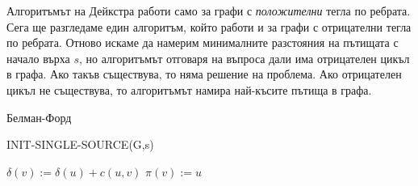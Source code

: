 Алгоритъмът на Дейкстра работи само за графи с {\em положителни} тегла по ребрата.
Сега ще разгледаме един алгоритъм, който работи и за графи с отрицателни тегла по ребрата.
Отново искаме да намерим минималните разстояния на пътищата с начало върха $s$, но
алгоритъмът отговаря на въпроса дали има отрицателен цикъл в графа. Ако такъв съществува, то няма решение на проблема.
Ако отрицателен цикъл не съществува, то алгоритъмът намира най-късите пътища в графа.


\begin{algorithm}
  \caption{Белман-Форд}
  \label{alg:belman-ford}
  
  \begin{algorithmic}[1]
    
    \STATE INIT-SINGLE-SOURCE(G,s)
    
    \STATE $\delta(v) := \delta(u) + c(u,v)$
    \STATE $\pi(v) := u$
    \ENDIF
    \ENDFOR
    \ENDFOR
    
    \RETURN \FALSE
    \ENDIF
    \ENDFOR
    \RETURN \TRUE
    
  \end{algorithmic}
\end{algorithm}


